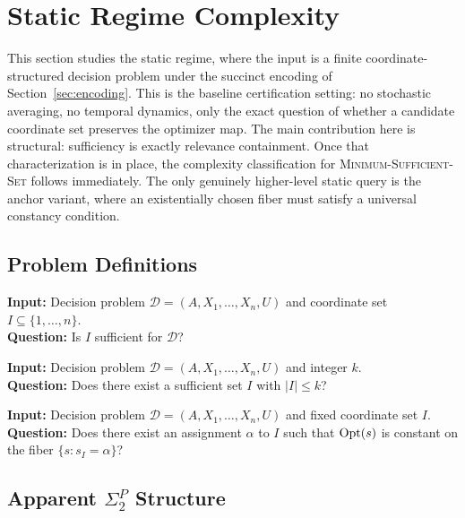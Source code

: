 \section{Static Regime Complexity}\label{sec:hardness}

This section studies the static regime, where the input is a finite coordinate-structured decision problem under the succinct encoding of Section~\ref{sec:encoding}. This is the baseline certification setting: no stochastic averaging, no temporal dynamics, only the exact question of whether a candidate coordinate set preserves the optimizer map. The main contribution here is structural: sufficiency is exactly relevance containment. Once that characterization is in place, the complexity classification for \textsc{Minimum-Sufficient-Set} follows immediately. The only genuinely higher-level static query is the anchor variant, where an existentially chosen fiber must satisfy a universal constancy condition.

\subsection{Problem Definitions}

\begin{problem}
\textbf{Input:} Decision problem $\mathcal{D}=(A,X_1,\ldots,X_n,U)$ and coordinate set $I \subseteq \{1,\ldots,n\}$. \\
\textbf{Question:} Is $I$ sufficient for $\mathcal{D}$?
\end{problem}

\begin{problem}
\textbf{Input:} Decision problem $\mathcal{D}=(A,X_1,\ldots,X_n,U)$ and integer $k$. \\
\textbf{Question:} Does there exist a sufficient set $I$ with $|I| \le k$?
\end{problem}

\begin{problem}
\textbf{Input:} Decision problem $\mathcal{D}=(A,X_1,\ldots,X_n,U)$ and fixed coordinate set $I$. \\
\textbf{Question:} Does there exist an assignment $\alpha$ to $I$ such that $\mathrm{Opt}(s)$ is constant on the fiber $\{s : s_I=\alpha\}$?
\end{problem}

\subsection{Apparent $\Sigma_2^P$ Structure}

